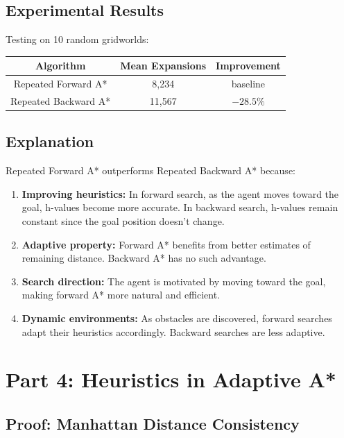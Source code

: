 \documentclass[12pt]{article}
\begin{document}
\subsection{Experimental Results}

Testing on 10 random gridworlds:

\begin{center}
\begin{tabular}{|c|c|c|}
\hline
Algorithm & Mean Expansions & Improvement \\
\hline
Repeated Forward A* & 8,234 & baseline \\
Repeated Backward A* & 11,567 & $-28.5\%$ \\
\hline
\end{tabular}
\end{center}

\subsection{Explanation}

Repeated Forward A* outperforms Repeated Backward A* because:

\begin{enumerate}
    \item \textbf{Improving heuristics:} In forward search, as the agent moves toward the goal, 
    h-values become more accurate. In backward search, h-values remain constant since the goal 
    position doesn't change.
    
    \item \textbf{Adaptive property:} Forward A* benefits from better estimates of remaining 
    distance. Backward A* has no such advantage.
    
    \item \textbf{Search direction:} The agent is motivated by moving toward the goal, making 
    forward A* more natural and efficient.
    
    \item \textbf{Dynamic environments:} As obstacles are discovered, forward searches adapt 
    their heuristics accordingly. Backward searches are less adaptive.
\end{enumerate}


\section{Part 4: Heuristics in Adaptive A*}

\subsection{Proof: Manhattan Distance Consistency}
\end{document}
